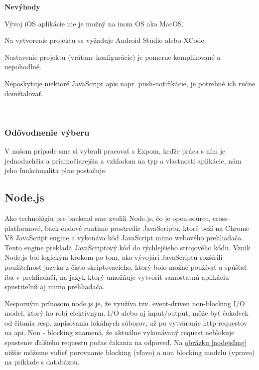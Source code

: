 {\bf Nevýhody}
\begin{itemize}
{\item Vývoj iOS aplikácie nie je možný na inom OS ako MacOS.} 
{\item Na vytvorenie projektu sa vyžaduje Android Studio alebo XCode.}
{\item Nastavenie projektu (vrátane konfigurácie) je pomerne komplikované a nepohodlné.} 
{\item Neposkytuje niektoré JavaScript \acrshort{api}s napr. push-notifikácie, je potrebné ich ručne doinštalovať.} \cite{rncli} \\
\end{itemize}

\subsubsection{Odôvodnenie výberu}
V našom prípade sme si vybrali pracovať s Expom, keďže práca s ním je jednoduchšia a priamočiarejšia a vzhľadom na typ a vlastnosti aplikácie, nám jeho funkcionalita plne postačuje. \\

\subsection{Node.js}
Ako technológiu pre backend sme zvolili Node.js, čo je open-source, cross-platformové, back-endové runtime prostredie JavaScriptu, ktoré beží na Chrome V8 JavaScript engine a vykonáva kód JavaScript mimo webového prehliadača. \cite{nodejswiki} Tento engine prekladá JavaScriptový kód do rýchlejšieho strojového kódu. Vznik Node.js bol logickým krokom po tom, ako vývojári JavaScriptu rozšírili použiteľnosť jazyka z čisto skriptovacieho, ktorý bolo možné používať a spúšťať iba v prehliadači, na jazyk ktorý umožňuje vytvoriť samostatnú aplikáciu spustiteľnú aj mimo prehliadača. 

Nesporným prínosom node.js je, že využíva tzv. event-driven non-blocking I/O model, ktorý ho robí efektívnym. I/O alebo aj input/output, môže byť čokoľvek od čítania resp. zapisovania lokálnych súborov, až po vytváranie \acrshort{http} requestov na \acrshort{api}. Non - blocking znamená, že aktuálne vykonávaný request neblokuje spustenie ďalšieho requestu počas čakania na odpoveď. Na \hyperref[nodejsImg]{ obrázku \ref{nodejsImg}} nižšie môžeme vidieť porovnanie blocking (vľavo) a non blocking modelu (vpravo) na príklade s databázou. \cite{nodejs} \\

